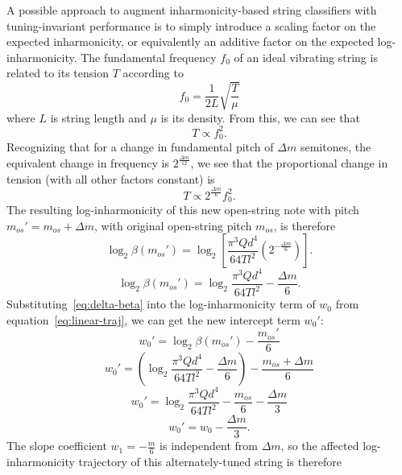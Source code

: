\documentclass[12pt]{cmuthesis}
\begin{document}
A possible approach to augment inharmonicity-based string classifiers with tuning-invariant performance is to simply introduce a scaling factor on the expected inharmonicity, or equivalently an additive factor on the expected log-inharmonicity. The fundamental frequency $f_0$ of an ideal vibrating string is related to its tension $T$ according to
\begin{equation}
f_0 = \frac{1}{2L}\sqrt{\frac{T}{\mu}}
\label{eq:freq-tension}
\end{equation}
where $L$ is string length and $\mu$ is its density. From this, we can see that
\begin{equation}
T \propto f_0^{2}.
\end{equation}
Recognizing that for a change in fundamental pitch of $\Delta m$ semitones, the equivalent change in frequency is $2^{\frac{\Delta m}{12}}$, we see that the proportional change in tension (with all other factors constant) is
\begin{equation}
T \propto 2^{\frac{\Delta m}{6}}f_0^2.
\end{equation}
The resulting log-inharmonicity of this new open-string note with pitch $m_{os}' = m_{os}+\Delta m$, with original open-string pitch $m_{os}$, is therefore
\begin{equation}
\log_2\beta(m_{os}') = \log_2[ \frac{\pi^3 Q d^4}{64 T l^2}(2^{-\frac{\Delta m}{6}})].
\end{equation}
\begin{equation}
\label{eq:delta-beta}
\log_2\beta(m_{os}') = \log_2\frac{\pi^3 Q d^4}{64 T l^2} - \frac{\Delta m}{6}.
\end{equation}
Substituting~\eqref{eq:delta-beta} into the log-inharmonicity term of $w_0$ from equation~\eqref{eq:linear-traj}, we can get the new intercept term $w_0':$
\begin{equation}
w_{0}' = \log_2{\beta}(m_{os}') - \frac{m_{os}'}{6}
\end{equation}
\begin{equation}
w_{0}' = (\log_2\frac{\pi^3 Q d^4}{64 T l^2} - \frac{\Delta m}{6}) - \frac{m_{os}+\Delta m}{6}
\end{equation}
\begin{equation}
\label{eq:3.17}
w_{0}' = \log_2\frac{\pi^3 Q d^4}{64 T l^2} - \frac{m_{os}}{6} - \frac{\Delta m}{3}
\end{equation}
\begin{equation}
\label{eq:3.18}
w_{0}' = w_0 - \frac{\Delta m}{3}.
\end{equation}
The slope coefficient $w_1 = -\frac{m}{6}$ is independent from ${\Delta m}$, so the affected log-inharmonicity trajectory of this alternately-tuned string is therefore
\end{document}
